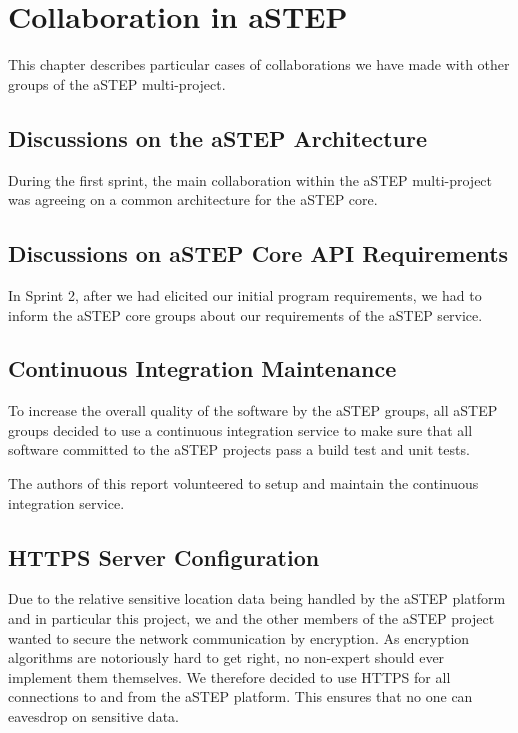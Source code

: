 \chapter{Collaboration in aSTEP}\label{ch:collab}

This chapter describes particular cases of collaborations we have made with other groups of the aSTEP multi-project.

\section{Discussions on the aSTEP Architecture}
During the first sprint, the main collaboration within the aSTEP multi-project was agreeing on a common architecture for the aSTEP core.



\section{Discussions on aSTEP Core API Requirements}
In Sprint 2, after we had elicited our initial program requirements, we had to inform the aSTEP core groups about our requirements of the aSTEP service.

\section{Continuous Integration Maintenance}
To increase the overall quality of the software by the aSTEP groups, all aSTEP groups decided to use a continuous integration service to make sure that all software committed to the aSTEP projects pass a build test and unit tests.

The authors of this report volunteered to setup and maintain the continuous integration service.

\section{HTTPS Server Configuration}
Due to the relative sensitive location data being handled by the aSTEP platform and in particular this project, we and the other members of the aSTEP project wanted to secure the network communication by encryption. As encryption algorithms are notoriously hard to get right, no non-expert should ever implement them themselves. We therefore decided to use HTTPS for all connections to and from the aSTEP platform. This ensures that no one can eavesdrop on sensitive data.


